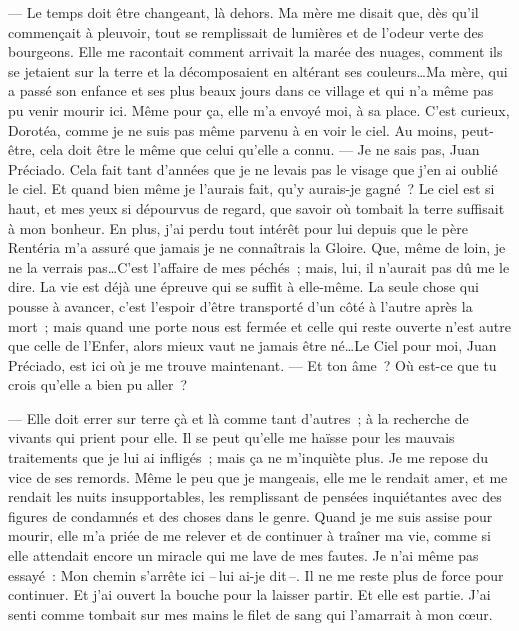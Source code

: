   --- Le temps doit être changeant, là dehors. Ma mère me disait que, dès qu’il commençait à pleuvoir, tout se remplissait de lumières et de l’odeur verte des bourgeons. Elle me racontait comment arrivait la marée des nuages, comment ils se jetaient sur la terre et la décomposaient en altérant ses couleurs\ldots Ma mère, qui a passé son enfance et ses plus beaux jours dans ce village et qui n’a même pas pu venir mourir ici. Même pour ça, elle m’a envoyé moi, à sa place. C’est curieux, Dorotéa, comme je ne suis pas même parvenu à en voir le ciel. Au moins, peut-être, cela doit être le même que celui qu’elle a connu.
\pend
%
\pstart
  --- Je ne sais pas, Juan Préciado. Cela fait tant d’années que je ne levais pas le visage que j’en ai oublié le ciel. Et quand bien même je l'aurais fait, qu’y aurais-je gagné ? Le ciel est si haut, et mes yeux si dépourvus de regard, que savoir où tombait la terre suffisait à mon bonheur. En plus, j’ai perdu tout intérêt pour lui depuis que le père Rentéria m’a assuré que jamais je ne connaîtrais la Gloire. Que, même de loin, je ne la verrais pas\ldots C’est l’affaire de mes péchés ; mais, lui, il n’aurait pas dû me le dire. La vie est déjà une épreuve qui se suffit à elle-même. La seule chose qui pousse à avancer, c’est l’espoir d’être transporté d’un côté à l’autre après la mort ; mais quand une porte nous est fermée et celle qui reste ouverte n'est autre que celle de l'Enfer, alors mieux vaut ne jamais être né\ldots Le Ciel pour moi, Juan Préciado, est ici où je me trouve maintenant.
\pend
%
\pstart
  --- Et ton âme ? Où est-ce que tu crois qu’elle a bien pu aller ?

  --- Elle doit errer sur terre çà et là comme tant d’autres ; à la recherche de vivants qui prient pour elle. Il se peut qu’elle me haïsse pour les mauvais traitements que je lui ai infligés ; mais ça ne m’inquiète plus. Je me repose du vice de ses remords. Même le peu que je mangeais, elle me le rendait amer, et me rendait les nuits insupportables, les remplissant de pensées inquiétantes avec des figures de condamnés et des choses dans le genre. Quand je me suis assise pour mourir, elle m’a priée de me relever et de continuer à traîner ma vie, comme si elle attendait encore un miracle qui me lave de mes fautes. Je n’ai même pas essayé : \og{}Mon chemin s’arrête ici --\,lui ai-je dit\,--. Il ne me reste plus de force pour continuer.\fg{} Et j’ai ouvert la bouche pour la laisser partir. Et elle est partie. J’ai senti comme tombait sur mes mains le filet de sang qui l’amarrait à mon cœur.
\pend
